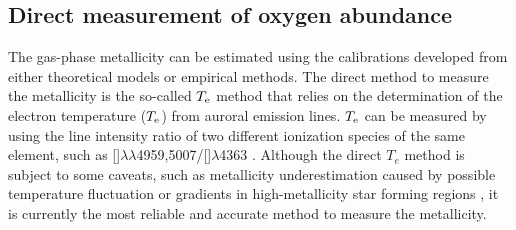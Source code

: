 \documentclass[twocolumn]{aastex631}
\newcommand{\OIII}{[\mbox{\ion{O}{3}}]}   %
\newcommand{\OIIIFOT}{[\mbox{\ion{O}{3}}]$\lambda$4363}
\newcommand{\OII}{[\mbox{\ion{O}{2}}]}    %
\newcommand{\Te}{\mbox{$T_{\rm e}$}}
\begin{document}
\subsection{Direct measurement of oxygen abundance}
The gas-phase metallicity can be estimated using the calibrations developed from either theoretical models or empirical methods. The direct method to measure the metallicity is the so-called {\Te} method that relies on the determination of the electron temperature (\Te) from auroral emission lines. {\Te} can be measured by using the line intensity ratio of two different ionization species of the same element,  such as \OIII$\lambda\lambda$4959,5007/\OIII$\lambda$4363 \citep{All84}. Although the direct $T_e$ method is subject to some caveats, such as metallicity underestimation caused by possible temperature fluctuation or gradients in high-metallicity star forming regions \citep{Kew08,md23}, it is currently the most reliable and accurate method to measure the metallicity. 


\end{document}
